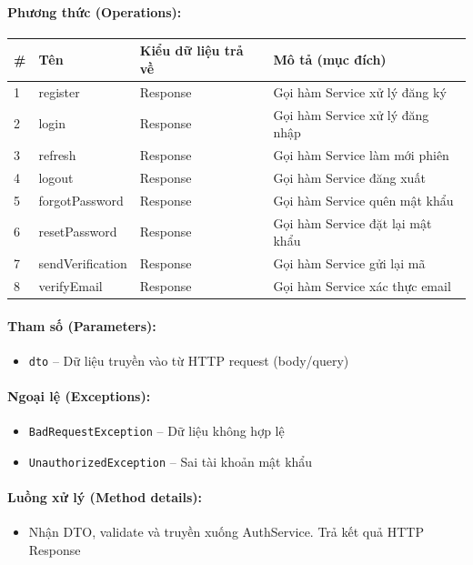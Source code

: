 \documentclass[12pt,a4paper]{article}
\begin{document}
\paragraph{Phương thức (Operations):}
\begin{longtable}{|p{0.6cm}|p{3.8cm}|p{2.6cm}|p{6.5cm}|}
\hline
\textbf{\#} & \textbf{Tên} & \textbf{Kiểu dữ liệu trả về} & \textbf{Mô tả (mục đích)} \\ \hline
\endhead
1 & register & Response & Gọi hàm Service xử lý đăng ký \\ \hline
2 & login & Response & Gọi hàm Service xử lý đăng nhập \\ \hline
3 & refresh & Response & Gọi hàm Service làm mới phiên \\ \hline
4 & logout & Response & Gọi hàm Service đăng xuất \\ \hline
5 & forgotPassword & Response & Gọi hàm Service quên mật khẩu \\ \hline
6 & resetPassword & Response & Gọi hàm Service đặt lại mật khẩu \\ \hline
7 & sendVerification & Response & Gọi hàm Service gửi lại mã \\ \hline
8 & verifyEmail & Response & Gọi hàm Service xác thực email \\ \hline
\end{longtable}

\paragraph{Tham số (Parameters):}
\begin{itemize}[leftmargin=*]
    \item \texttt{dto} – Dữ liệu truyền vào từ HTTP request (body/query)
\end{itemize}


\paragraph{Ngoại lệ (Exceptions):}
\begin{itemize}[leftmargin=*]
    \item \texttt{BadRequestException} – Dữ liệu không hợp lệ
    \item \texttt{UnauthorizedException} – Sai tài khoản mật khẩu
\end{itemize}


\paragraph{Luồng xử lý (Method details):}
\begin{itemize}[leftmargin=*]
    \item Nhận DTO, validate và truyền xuống AuthService. Trả kết quả HTTP Response
\end{itemize}
\end{document}
